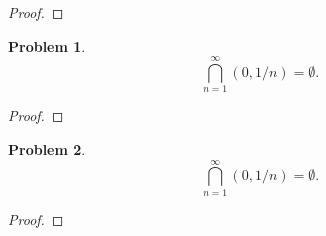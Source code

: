 \documentclass[12pt]{article}
\newtheorem{problem}{Problem}
\begin{document}
\begin{proof}
\end{proof}


\begin{problem} %
    $$\bigcap_{n=1}^\infty (0,1/n)=\emptyset.$$
\end{problem}


\begin{proof}
\end{proof}


\begin{problem} %
    $$\bigcap_{n=1}^\infty (0,1/n)=\emptyset.$$
\end{problem}


\begin{proof}
\end{proof}
\end{document}
